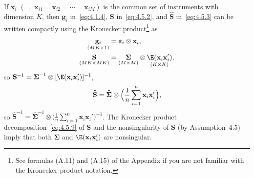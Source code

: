 If $\mathbf{x}_i$ $(= \mathbf{x}_{i1} = \mathbf{x}_{i2} = \cdots = \mathbf{x}_{iM})$
is the common set of instruments with dimension $K$, then $\mathbf{g}_i$
in~\eqref{eq:4.1.4}, $\mathbf{S}$ in~\eqref{eq:4.5.2}, and $\widehat{\mathbf{S}}$
in~\eqref{eq:4.5.3} can be written compactly using the Kronecker
product\footnote{See formulas (A.11) and (A.15) of the Appendix if you are not
familiar with the Kronecker product notation.} as
\begin{align}
\underset{(MK \times 1)}{\mathbf{g}_i} &= \boldsymbol{\varepsilon}_i \otimes \mathbf{x}_i,
\label{eq:4.5.8} \\
\underset{(MK \times MK)}{\mathbf{S}} &= \underset{(M \times M)}{\boldsymbol{\Sigma}}
\otimes \underset{(K \times K)}{\E(\mathbf{x}_i \mathbf{x}_i')},
\label{eq:4.5.9}
\end{align}
so $\mathbf{S}^{-1} = \boldsymbol{\Sigma}^{-1} \otimes
[\E(\mathbf{x}_i \mathbf{x}_i')]^{-1}$,
\begin{equation}
\widehat{\mathbf{S}} = \widehat{\boldsymbol{\Sigma}} \otimes
\Bigl(\frac{1}{n} \sum_{i=1}^{n} \mathbf{x}_i \mathbf{x}_i'\Bigr),
\label{eq:4.5.10}
\end{equation}
so $\widehat{\mathbf{S}}^{-1} = \widehat{\boldsymbol{\Sigma}}^{-1} \otimes
\bigl(\frac{1}{n} \sum_{i=1}^{n} \mathbf{x}_i \mathbf{x}_i'\bigr)^{-1}$.
The Kronecker product decomposition~\eqref{eq:4.5.9} of $\mathbf{S}$ and
the nonsingularity of $\mathbf{S}$ (by Assumption~4.5) imply that both
$\boldsymbol{\Sigma}$ and $\E(\mathbf{x}_i \mathbf{x}_i')$ are nonsingular.


